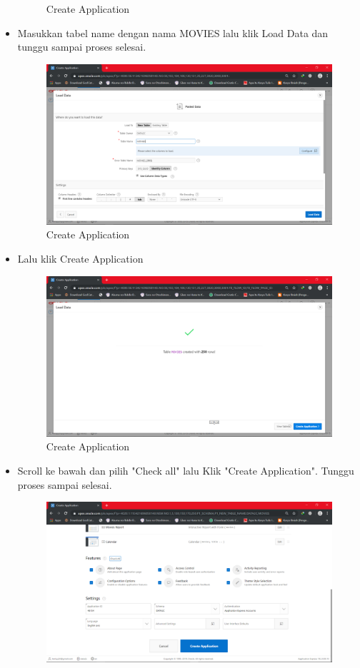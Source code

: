 \documentclass[12pt, times new roman]{article}
\begin{document}
\begin{itemize}
\begin{figure}[!htpb]
	\caption{Create Application}
\end{figure}
\item Masukkan tabel name dengan nama MOVIES lalu klik Load Data dan tunggu sampai proses selesai.
\begin{figure}[!htpb]
	\centering
	\includegraphics[width=12cm]{figures/Screenshot_4.png}
	\caption{Create Application}
\end{figure}
\item Lalu klik Create Application
\begin{figure}[!htpb]
	\centering
	\includegraphics[width=12cm]{figures/Screenshot_5.png}
	\caption{Create Application}
\end{figure}
\item Scroll ke bawah dan pilih "Check all" lalu Klik "Create Application". Tunggu proses sampai selesai.
\begin{figure}[!htpb]
	\centering
	\includegraphics[width=12cm]{figures/Screenshot_6.png}

\end{figure}
\end{itemize}
\end{document}
